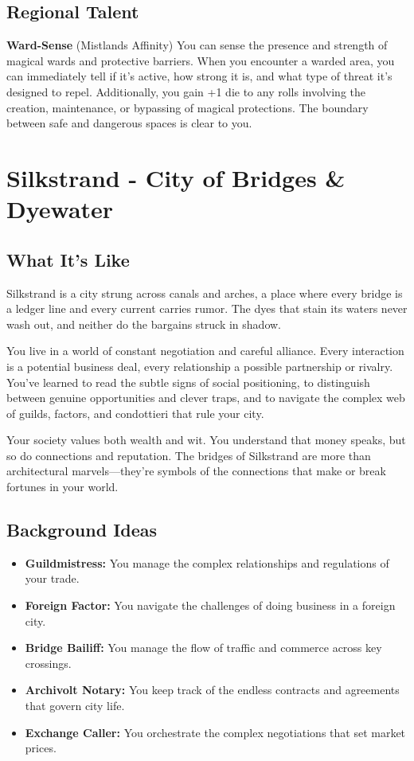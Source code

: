 \documentclass[11pt]{article}
\newcommand{\region}[1]{\section*{#1}}
\newcommand{\subregion}[1]{\subsection*{#1}}
\begin{document}
\begin{multicols}{2}
\subregion{Regional Talent}

\textbf{Ward-Sense} (Mistlands Affinity)
You can sense the presence and strength of magical wards and protective barriers. When you encounter a warded area, you can immediately tell if it's active, how strong it is, and what type of threat it's designed to repel. Additionally, you gain +1 die to any rolls involving the creation, maintenance, or bypassing of magical protections. The boundary between safe and dangerous spaces is clear to you.

\end{multicols}

\region{Silkstrand - City of Bridges \& Dyewater}

\begin{multicols}{2}
\subregion{What It's Like}

Silkstrand is a city strung across canals and arches, a place where every bridge is a ledger line and every current carries rumor. The dyes that stain its waters never wash out, and neither do the bargains struck in shadow.

You live in a world of constant negotiation and careful alliance. Every interaction is a potential business deal, every relationship a possible partnership or rivalry. You've learned to read the subtle signs of social positioning, to distinguish between genuine opportunities and clever traps, and to navigate the complex web of guilds, factors, and condottieri that rule your city.

Your society values both wealth and wit. You understand that money speaks, but so do connections and reputation. The bridges of Silkstrand are more than architectural marvels—they're symbols of the connections that make or break fortunes in your world.

\columnbreak

\subregion{Background Ideas}

\begin{itemize}[leftmargin=*]
    \item \textbf{Guildmistress:} You manage the complex relationships and regulations of your trade.
    \item \textbf{Foreign Factor:} You navigate the challenges of doing business in a foreign city.
    \item \textbf{Bridge Bailiff:} You manage the flow of traffic and commerce across key crossings.
    \item \textbf{Archivolt Notary:} You keep track of the endless contracts and agreements that govern city life.
    \item \textbf{Exchange Caller:} You orchestrate the complex negotiations that set market prices.
\end{itemize}


\end{multicols}
\end{document}

